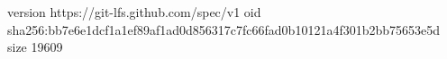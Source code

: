version https://git-lfs.github.com/spec/v1
oid sha256:bb7e6e1dcf1a1ef89af1ad0d856317c7fc66fad0b10121a4f301b2bb75653e5d
size 19609
